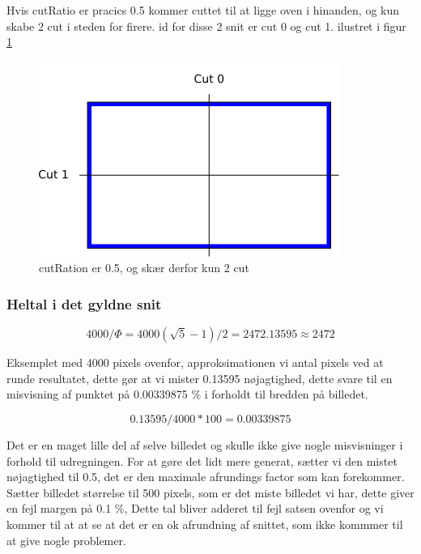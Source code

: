 Hvis cutRatio er pracics 0.5 kommer cuttet til at ligge oven i hinanden,
og kun skabe 2 cut i steden for firere. id for disse 2 snit er cut 0 og
cut 1. ilustret i figur \ref{2Cut}

\begin{figure}[h]
	\begin{center}
		\includegraphics[scale=0.42,angle=0]{afsnit/vores_implementation/billeder/naiv_algoritme/2Cut}
	\end{center}
	\caption[]{cutRation er 0.5, og skær derfor kun 2 cut}
	\label{2Cut}
\end{figure}

\subsubsection*{Heltal i det gyldne snit}

\begin{equation}
	4000/\varPhi = 4000(\sqrt{5}-1)/2 = 2472.13595 \approx 2472
\end{equation}

Eksemplet med 4000 pixels ovenfor, approksimationen vi antal pixels ved at
runde resultatet, dette gør at vi mister 0.13595 nøjagtighed, dette svare
til en misvisning af punktet på 0.00339875 $\%$ i forholdt til bredden på
billedet. 

\begin{equation}
	0.13595/4000*100 = 0.00339875
\end{equation}

Det er en maget lille del af selve billedet og skulle ikke give nogle
misvisninger i forhold til udregningen. For at gøre det lidt mere
generat, sætter vi den mistet nøjagtighed til 0.5, det er den maximale
afrundings factor som kan forekommer. Sætter billedet størrelse til 500
pixels, som er det miste billedet vi har, dette giver en fejl margen på
0.1 $\%$, Dette tal bliver adderet til fejl satsen ovenfor og vi kommer
til at at se at det er en ok afrundning af snittet, som ikke kommmer til
at give nogle problemer. 


